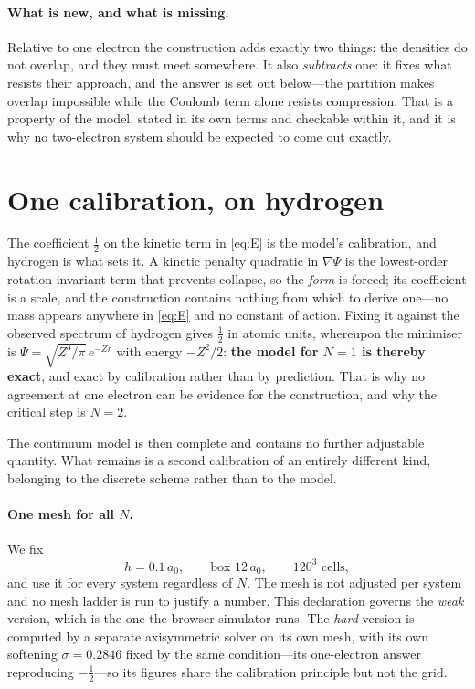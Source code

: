 \documentclass[11pt,a4paper]{article}
\begin{document}
\paragraph{What is new, and what is missing.} Relative to one electron the construction adds exactly
two things: the densities do not overlap, and they must meet somewhere. It also \emph{subtracts}
one: it fixes what resists their approach, and the answer is set out below---the partition makes
overlap impossible while the Coulomb term alone resists compression. That is a property of the
model, stated in its own terms and checkable within it, and it is why no two-electron system should
be expected to come out exactly.

\section{One calibration, on hydrogen}

The coefficient $\tfrac12$ on the kinetic term in \eqref{eq:E} is the model's calibration, and
hydrogen is what sets it. A kinetic penalty quadratic in $\nabla\Psi$ is the lowest-order
rotation-invariant term that prevents collapse, so the \emph{form} is forced; its coefficient is a
scale, and the construction contains nothing from which to derive one---no mass appears anywhere in
\eqref{eq:E} and no constant of action. Fixing it against the observed spectrum of hydrogen gives
$\tfrac12$ in atomic units, whereupon the minimiser is $\Psi = \sqrt{Z^3/\pi}\,e^{-Zr}$ with energy
$-Z^2/2$: \textbf{the model for $N = 1$ is thereby exact}, and exact by calibration rather than by
prediction. That is why no agreement at one electron can be evidence for the construction, and why
the critical step is $N = 2$.

The continuum model is then complete and contains no further adjustable quantity. What remains is a
second calibration of an entirely different kind, belonging to the discrete scheme rather than to
the model.

\paragraph{One mesh for all $N$.} We fix
\begin{equation}
  h = 0.1\,a_0 , \qquad \text{box } 12\,a_0 , \qquad 120^3 \text{ cells},
  \label{eq:grid}
\end{equation}
and use it for every system regardless of $N$. The mesh is not adjusted per system and no mesh
ladder is run to justify a number. This declaration governs the \emph{weak} version, which is the
one the browser simulator runs. The \emph{hard} version is computed by a separate axisymmetric solver
on its own mesh, with its own softening $\sigma = 0.2846$ fixed by the same condition---its
one-electron answer reproducing $-\tfrac12$---so its figures share the calibration principle but not
the grid.
\end{document}
